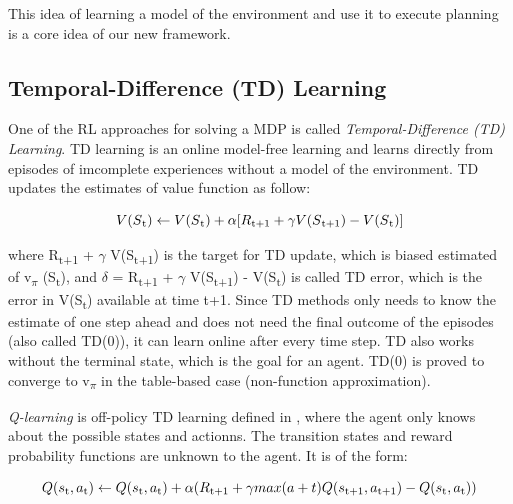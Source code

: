\documentclass[12pt,twoside]{report}
\theoremstyle{plain}
\theoremstyle{definition}
\begin{document}
This idea of learning a model of the environment and use it to execute planning is a core idea of our new framework. 

\subsection{Temporal-Difference (TD) Learning}
\label{td_learning_section}

One of the RL approaches for solving a MDP is called \textit{Temporal-Difference (TD) Learning}.
TD learning is an online model-free learning and learns directly from episodes of imcomplete experiences without a model of the environment.
TD updates the estimates of value function as follow:

\begin{equation}
\centering
V(S\textsubscript{t}) \leftarrow V(S\textsubscript{t}) + \alpha[R\textsubscript{t+1} + \gamma V(S\textsubscript{t+1}) - V(S\textsubscript{t})]
\end{equation}

where R\textsubscript{t+1} + $\gamma$ V(S\textsubscript{t+1}) is the target for TD update, which is biased estimated of v\textsubscript{$\pi$} (S\textsubscript{t}), and $\delta$ = R\textsubscript{t+1} + $\gamma$ V(S\textsubscript{t+1}) - V(S\textsubscript{t}) is called TD error, which is the error in V(S\textsubscript{t}) available at time t+1.
Since TD methods only needs to know the estimate of one step ahead and does not need the final outcome of the episodes (also called TD(0)), it can learn online after every time step. TD also works without the terminal state, which is the goal for an agent.
TD(0) is proved to converge to v\textsubscript{$\pi$} in the table-based case (non-function approximation).


\textit{Q-learning} is off-policy TD learning defined in \cite{Watkins}, where the agent only knows about the possible states and actionns. The transition states and reward probability functions are unknown to the agent.
It is of the form:

\begin{equation}
Q(s\textsubscript{t},a\textsubscript{t}) \leftarrow Q(s\textsubscript{t},a\textsubscript{t}) +  \alpha(R\textsubscript{t+1} + \gamma  max (a+t) Q(s\textsubscript{t+1}, a\textsubscript{t+1}) - Q(s\textsubscript{t}, a\textsubscript{t}))
\end{equation}
\end{document}
